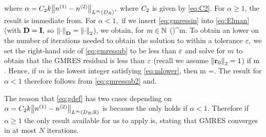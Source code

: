 where $\alpha = \Ct k \NLiDR{\nso-\nst},$ where $C_{2}$ is given by \cref{eq:C2}.
\ele
{}
For $\alpha \geq 1$, the result is immediate from. For $\alpha < 1,$ if we insert \cref{eq:gmressin} into \cref{eq:Elman} (with $\mathbf{D}=\mathbf{I},$ so $\NDmat{\cdot} = \Nt{\cdot}$), we obtain, for $m \in \mathbb N$
\beq\label{eq:gmressub}
\frac{\Nt{\brm}}{\Nt{\brz}} \leq \mleft(\mright)^m.
\eeq
To obtain an lower on the number of iterations needed to obtain the solution to within a tolerance $\varepsilon,$ we set the right-hand side of \cref{eq:gmressub} to be less than $\varepsilon$ and solve for $m$ to obtain that the GMRES residual is less than $\varepsilon$ (recall we assume $\Nt{\brz} = 1$) if
\beq\label{eq:mlower}
m \geq {}.
\eeq
Hence, if $m$ is the lowest integer satisfying \cref{eq:mlower}, then
\beq\label{eq:gmressub2}
m =.
\eeq
The result for $\alpha < 1$ therefore follows from \cref{eq:gmressub2} and.
\epf

The reason that \cref{eq:gdef} has two cases depending on $\alpha = \Ct k \NLiDRRR{\nso-\nst}$ is because the  only holds if $\alpha < 1$. Therefore if $\alpha \geq 1$ the only result available for us to apply is, stating that GMRES converges in at most $N$ iterations.
\ere
{}

